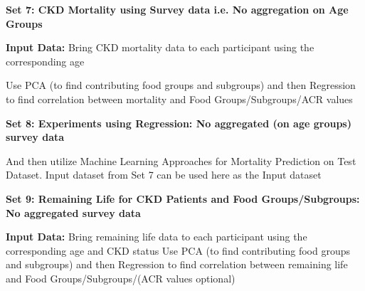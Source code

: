 \noindent \textbf{Set 7: CKD Mortality using Survey data i.e. No aggregation on Age Groups}

\noindent \textbf{Input Data:} Bring CKD mortality data to each participant using the corresponding age

\noindent Use PCA (to find contributing food groups and subgroups) and then Regression to find correlation between mortality and Food Groups/Subgroups/ACR values

\noindent \textbf{Set 8: Experiments using Regression: No aggregated (on age groups) survey data} 

\noindent And then utilize Machine Learning Approaches for Mortality Prediction on Test Dataset. Input dataset from Set 7 can be used here as the Input dataset

\noindent \textbf{Set 9: Remaining Life for CKD Patients and Food Groups/Subgroups: No aggregated survey data}

\noindent \textbf{Input Data:} Bring remaining life data to each participant using the corresponding age and CKD status
Use PCA (to find contributing food groups and subgroups) and then Regression to find correlation between remaining life  and Food Groups/Subgroups/(ACR values optional)